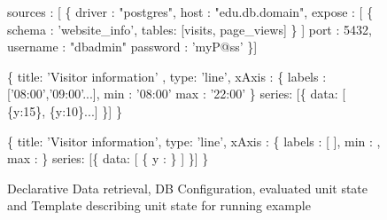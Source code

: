 \begin{figure}[hbt!]
\begin{minipage}[c]{7cm}
 
 \begin{minipage}[c]{7cm}
 \begin{code}
 sources : [ \{ 
      driver   : "postgres", 
      host     : "edu.db.domain", 
      expose   : [ \{
       schema : 'website_info', 
       tables: [visits, page_views] \} ]
      port     : 5432, 
      username : "dbadmin" 
      password : 'myP@ss'
    \}] 
 \end{code}
 \vspace*{-0.4cm}
 \vspace*{0.3cm}
 \label{figure:source-config-file}
 \end{minipage}
 \vspace*{0.6cm}
 \end{minipage}
 \hspace{2cm}
 \begin{minipage}[c]{6cm}
 \begin{minipage}[c]{7.5cm}
 \begin{code}
    \{
     title: 'Visitor information' ,
     type: 'line',
     xAxis : \{ 
       labels : ['08:00','09:00'...],
       min : '08:00'
       max : '22:00'
     \}
     series: [\{ data: [ \{y:15\}, \{y:10\}...] \}]
   \} 
 \end{code}
 \vspace*{-0.4cm}
 \vspace*{0.3cm}
 \label{figure:running-example:unit-body}
 \end{minipage}
 \begin{minipage}[c]{7.5cm}
 \begin{code}
    \{
     title: 'Visitor information',
     type: 'line',
     xAxis : \{ 
       labels : [
         ],
       min : ,
       max : 
     \}
     series: [\{
       data: [ 
           \{
             y  : 
           \}
          ]
     \}]
   \} 
 \end{code}
 \vspace*{-0.3cm}
 \vspace*{0cm}
 \label{figure:first-running-example:main-template}
 \end{minipage}
 \end{minipage}
 \vspace*{-0.3cm}
 \caption{Declarative Data retrieval, DB Configuration, evaluated unit state and Template describing unit state for running example}
 \vspace*{-0.3cm}
 \end{figure}
